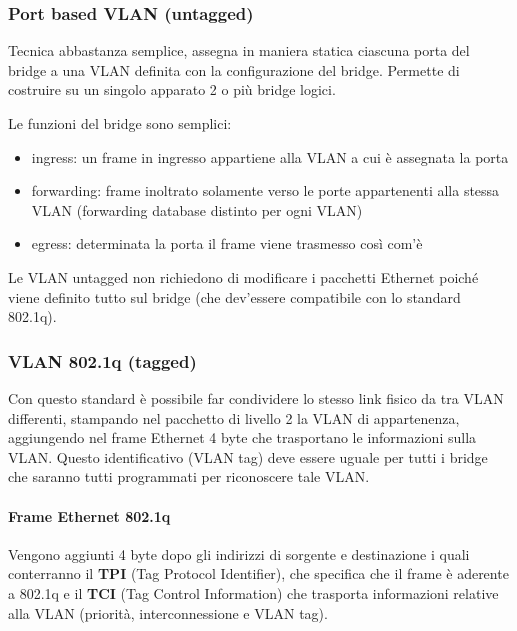 \documentclass[
]{article}
\begin{document}
\hypertarget{header-n329}{%
\subsubsection{Port based VLAN (untagged)}\label{header-n329}}

Tecnica abbastanza semplice, assegna in maniera statica ciascuna porta
del bridge a una VLAN definita con la configurazione del bridge.
Permette di costruire su un singolo apparato 2 o più bridge logici.

Le funzioni del bridge sono semplici:

\begin{itemize}
\item
  ingress: un frame in ingresso appartiene alla VLAN a cui è assegnata
  la porta
\item
  forwarding: frame inoltrato solamente verso le porte appartenenti alla
  stessa VLAN (forwarding database distinto per ogni VLAN)
\item
  egress: determinata la porta il frame viene trasmesso così com'è
\end{itemize}

Le VLAN untagged non richiedono di modificare i pacchetti Ethernet
poiché viene definito tutto sul bridge (che dev'essere compatibile con
lo standard 802.1q).

\hypertarget{header-n340}{%
\subsubsection{VLAN 802.1q (tagged)}\label{header-n340}}

Con questo standard è possibile far condividere lo stesso link fisico da
tra VLAN differenti, stampando nel pacchetto di livello 2 la VLAN di
appartenenza, aggiungendo nel frame Ethernet 4 byte che trasportano le
informazioni sulla VLAN. Questo identificativo (VLAN tag) deve essere
uguale per tutti i bridge che saranno tutti programmati per riconoscere
tale VLAN.

\hypertarget{header-n342}{%
\paragraph{Frame Ethernet 802.1q}\label{header-n342}}

Vengono aggiunti 4 byte dopo gli indirizzi di sorgente e destinazione i
quali conterranno il \textbf{TPI} (Tag Protocol Identifier), che
specifica che il frame è aderente a 802.1q e il \textbf{TCI} (Tag
Control Information) che trasporta informazioni relative alla VLAN
(priorità, interconnessione e VLAN tag).
\end{document}
